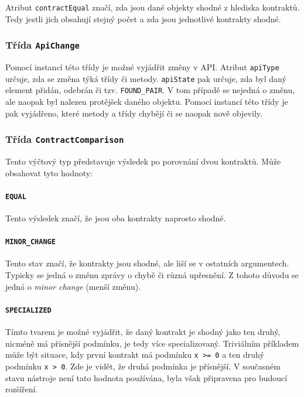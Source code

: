 						Atribut \texttt{contractEqual} značí, zda jsou dané objekty shodné z hlediska kontraktů. Tedy jestli jich obsahují stejný počet a zda jsou jednotlivé kontrakty shodné.
		
					\subsubsection{Třída \texttt{ApiChange}}
						Pomocí instancí této třídy je možné vyjádřit změny v API. Atribut \texttt{apiType} určuje, zda se změna týká třídy či metody. \texttt{apiState} pak určuje, zda byl daný element přidán, odebrán či tzv. \texttt{FOUND\_PAIR}. V tom případě se nejedná o změnu, ale naopak byl nalezen protějšek daného objektu. Pomocí instancí této třídy je pak vyjádřeno, které metody a třídy chybějí či se naopak nově objevily.
						
					\subsubsection{Třída \texttt{ContractComparison}}
						Tento výčtový typ představuje výsledek po porovnání dvou kontraktů. Může obsahovat tyto hodnoty:
						
						\paragraph{\texttt{EQUAL}}
							Tento výsledek značí, že jsou oba kontrakty naprosto shodné.
						
						\paragraph{\texttt{MINOR\_CHANGE}}
							Tento stav značí, že kontrakty jsou shodné, ale liší se v ostatních argumentech. Typicky se jedná o změnu zprávy o chybě či různá upřesnění. Z tohoto důvodu se jedná o \emph{minor change} (menší změnu).
							
						\paragraph{\texttt{SPECIALIZED}}
							Tímto tvarem je možné vyjádřit, že daný kontrakt je shodný jako ten druhý, nicméně má přísnější podmínku, je tedy více specializovaný. Triviálním příkladem může být situace, kdy první kontrakt má podmínku \texttt{x >= 0} a ten druhý podmínku \texttt{x > 0}. Zde je vidět, že druhá podmínka je přísnější. V současném stavu nástroje není tato hodnota používána, byla však připravena pro budoucí rozšíření.
							
